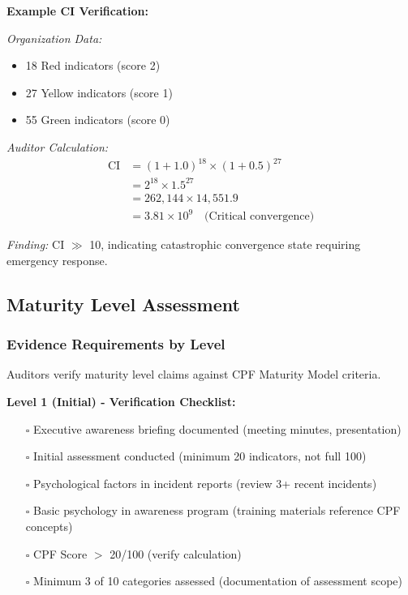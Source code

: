 \documentclass[11pt,a4paper]{article}
\begin{document}
\textbf{Example CI Verification:}

\textit{Organization Data:}
\begin{itemize}
\item 18 Red indicators (score 2)
\item 27 Yellow indicators (score 1)
\item 55 Green indicators (score 0)
\end{itemize}

\textit{Auditor Calculation:}
\begin{align*}
\text{CI} &= (1+1.0)^{18} \times (1+0.5)^{27} \\
&= 2^{18} \times 1.5^{27} \\
&= 262,144 \times 14,551.9 \\
&= 3.81 \times 10^9 \quad \text{(Critical convergence)}
\end{align*}

\textit{Finding:} CI $\gg$ 10, indicating catastrophic convergence state requiring emergency response.

\subsection{Maturity Level Assessment}

\subsubsection{Evidence Requirements by Level}

Auditors verify maturity level claims against CPF Maturity Model criteria.

\textbf{Level 1 (Initial) - Verification Checklist:}

\begin{itemize}
\item[$\square$] Executive awareness briefing documented (meeting minutes, presentation)
\item[$\square$] Initial assessment conducted (minimum 20 indicators, not full 100)
\item[$\square$] Psychological factors in incident reports (review 3+ recent incidents)
\item[$\square$] Basic psychology in awareness program (training materials reference CPF concepts)
\item[$\square$] CPF Score $>$ 20/100 (verify calculation)
\item[$\square$] Minimum 3 of 10 categories assessed (documentation of assessment scope)
\end{itemize}
\end{document}
